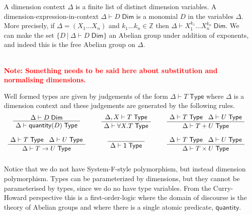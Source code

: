 \documentclass[a4paper,UKenglish]{lipics}
\newcommand\note[1]{{ \bf \textcolor{red} {\vspace{2mm}\; \\ Note: #1\\}}}
\newcommand{\msf}[1]{\mathsf{#1}} %
\newcommand{\Ab}{\msf{Ab}}
\newcommand{\LAb}{\msf{L}_{\msf{Ab}}}
\newcommand{\C}{\mathcal{C}}
\newcommand{\unitTy}{\msf{1}}
\newcommand{\qnt}{\msf{quantity}}
\newcommand{\Tj}[2]{#1 \vdash #2 \; \msf{ Type}}
\newcommand{\Dj}[2]{#1 \vdash #2 \; \msf{ Dim}}
\newcommand{\Dim}{D}
\newcommand{\Dvar}{X}
\begin{document}
\vspace{3mm} 
A dimension context $\Delta$ is a finite list of distinct
dimension variables.
A dimension-expression-in-context $\Dj\Delta \Dim$ is a monomial
$\Dim$ in the variables $\Delta$.
More precisely,
if $\Delta=(\Dvar_1\dots \Dvar_n)$ and $k_1\dots k_n\in\mathbb Z$
then $\Dj \Delta{\Dvar_1^{k_1}\dots \Dvar_n^{k_n}}$.
We can make the set $\{\Dim~|~\Dj \Delta \Dim\}$ an Abelian group under addition of
exponents, and indeed this is the free Abelian group on $\Delta$.

\note{Something needs to be said here about substitution and normalising dimensions.}


\vspace{3mm}  Well formed types are given by judgements of the form $\Tj\Delta  T$ where
$\Delta$ is a dimension context and these judgements are generated by the following rules.
\[\begin{array}{ccc}
\AxiomC{$\Dj\Delta \Dim$}
		\UnaryInfC{$\Tj\Delta {\qnt(\Dim)}$}
		\DisplayProof

&\hspace{5mm}
\AxiomC{$\Tj {\Delta, \Dvar}  T$}
	\UnaryInfC{$\Tj \Delta{ \forall \Dvar.T} $}
	\DisplayProof
&\hspace{5mm}
\AxiomC{$\Delta \vdash T \; \msf{ Type} \; \; \; \Delta \vdash U \; \msf{ Type}$}
	\UnaryInfC{$\Delta \vdash T + U \; \msf{ Type}$}
	\DisplayProof
\\ \\
\AxiomC{$\Delta \vdash T \; \msf{ Type} \; \; \; \Delta \vdash U \; \msf{ Type}$}
	\UnaryInfC{$\Delta \vdash T \rightarrow U  \; \msf{ Type}$}
	\DisplayProof
&\hspace{5mm}
\AxiomC{ \;  }
		\UnaryInfC{$\Delta \vdash \unitTy \; \msf{ Type}$}
	\DisplayProof
&\hspace{5mm}
\AxiomC{$\Delta \vdash T \; \msf{ Type} \; \; \; \Delta \vdash U \; \msf{ Type}$}
	\UnaryInfC{$\Delta \vdash T\times U \; \msf{ Type}$}
	\DisplayProof
\\ \\
\end{array}\]
Notice that we do not have System-F-style polymorphism, but instead dimension polymorphism. Types can be parameterized by dimensions, but they cannot be parameterised by types, since we do no have type variables. From the Curry-Howard perspective this is a first-order-logic where the domain of discourse is the theory of Abelian groups and where there is a single atomic predicate, $\qnt$.
\end{document}
